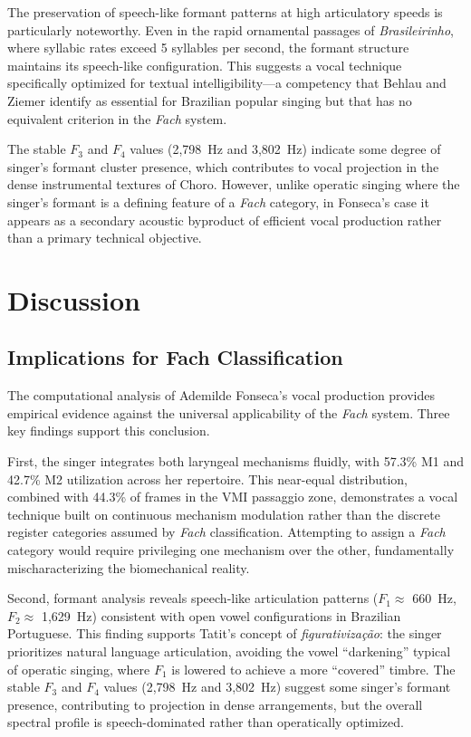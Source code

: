 \documentclass[review,3p,number]{elsarticle}
\begin{document}
The preservation of speech-like formant patterns at high articulatory speeds is
particularly noteworthy. Even in the rapid ornamental passages of
\emph{Brasileirinho}, where syllabic rates exceed 5 syllables per second, the
formant structure maintains its speech-like configuration. This suggests a vocal
technique specifically optimized for textual intelligibility---a competency that
Behlau and Ziemer\cite{behlau1988} identify as essential for Brazilian popular
singing but that has no equivalent criterion in the \emph{Fach} system.

The stable $F_3$ and $F_4$ values (2,798~Hz and 3,802~Hz) indicate some degree of
singer's formant cluster presence, which contributes to vocal projection in the dense
instrumental textures of Choro. However, unlike operatic singing where the singer's
formant is a defining feature of a \emph{Fach} category, in Fonseca's case it appears
as a secondary acoustic byproduct of efficient vocal production rather than a primary
technical objective.

\section{Discussion}
\label{sec:discussion}

\subsection{Implications for Fach Classification}
\label{sec:fach_implications}

The computational analysis of Ademilde Fonseca's vocal production provides empirical
evidence against the universal applicability of the \emph{Fach} system. Three key
findings support this conclusion.

First, the singer integrates both laryngeal mechanisms fluidly, with 57.3\% M1 and
42.7\% M2 utilization across her repertoire. This near-equal distribution, combined
with 44.3\% of frames in the VMI passaggio zone, demonstrates a vocal technique
built on continuous mechanism modulation rather than the discrete register categories
assumed by \emph{Fach} classification. Attempting to assign a \emph{Fach} category
would require privileging one mechanism over the other, fundamentally
mischaracterizing the biomechanical reality.

Second, formant analysis reveals speech-like articulation patterns ($F_1 \approx$
660~Hz, $F_2 \approx$ 1,629~Hz) consistent with open vowel configurations in
Brazilian Portuguese. This finding supports Tatit's concept of
\emph{figurativiza\c{c}\~{a}o}\cite{tatit2002}: the singer prioritizes natural language
articulation, avoiding the vowel ``darkening'' typical of operatic singing, where $F_1$
is lowered to achieve a more ``covered'' timbre. The stable $F_3$ and $F_4$ values
(2,798~Hz and 3,802~Hz) suggest some singer's formant presence, contributing to
projection in dense arrangements, but the overall spectral profile is
speech-dominated rather than operatically optimized.
\end{document}
